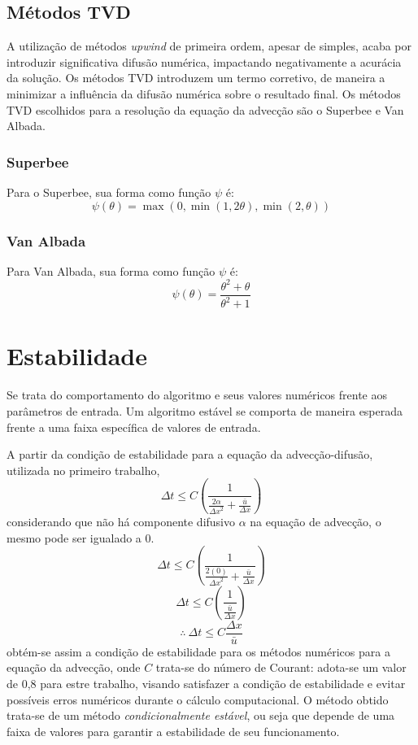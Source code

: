 \subsection{Métodos TVD}
A utilização de métodos \textit{upwind} de primeira ordem, apesar de simples,
acaba por introduzir significativa difusão numérica, impactando negativamente a
acurácia da solução. Os métodos TVD introduzem um termo corretivo, de maneira a
minimizar a influência da difusão numérica sobre o resultado final. Os métodos
TVD escolhidos para a resolução da equação da advecção são o Superbee e Van
Albada.

\subsubsection{Superbee}
Para o Superbee, sua forma como função $\psi$ é:
\begin{equation}\label{Superbee}
    \psi(\theta) = \max(0, \min(1,2\theta), \min(2,\theta))
\end{equation}

\subsubsection{Van Albada}
Para Van Albada, sua forma como função $\psi$ é:
\begin{equation}\label{Van Albada}
    \psi(\theta) = \frac{\theta^2 + \theta}{\theta^2 + 1}
\end{equation}

\section{Estabilidade}
Se trata do comportamento do algoritmo e seus valores numéricos frente aos
parâmetros de entrada. Um algoritmo estável se comporta de maneira esperada
frente a uma faixa específica de valores de entrada.

A partir da condição de estabilidade para a equação da advecção-difusão,
utilizada no primeiro trabalho,
\begin{equation}
    \Delta t
    \leq
    C\left(
        \frac{1}{\frac{2\alpha}{{\Delta x}^2} + \frac{\bar{u}}{\Delta x}}
    \right)
\end{equation}
considerando que não há componente difusivo $\alpha$ na equação de advecção, o
mesmo pode ser igualado a 0.
\[
    \Delta t
    \leq
    C\left(
        \frac{1}{\frac{2(0)}{{\Delta x}^2} + \frac{\bar{u}}{\Delta x}}
    \right)
\]
\[
    \Delta t \leq C\left( \frac{1}{\frac{\bar{u}}{\Delta x}} \right)
\]
\begin{equation}
    \therefore\ \Delta t \leq C\frac{\Delta x}{\bar{u}}
\end{equation}
obtém-se assim a condição de estabilidade para os métodos numéricos para a
equação da advecção, onde $C$ trata-se do número de Courant: adota-se um valor
de 0,8 para estre trabalho, visando satisfazer a condição de estabilidade e
evitar possíveis erros numéricos durante o cálculo computacional. O método
obtido trata-se de um método \emph{condicionalmente estável}, ou seja que
depende de uma faixa de valores para garantir a estabilidade de seu
funcionamento.

